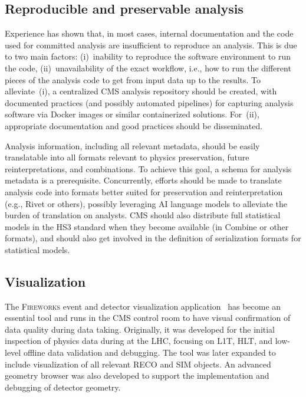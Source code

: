\subsection{Reproducible and preservable analysis}

Experience has shown that, in most cases, internal documentation and the code used for committed analysis are insufficient to reproduce an analysis. This is due to two main factors: (i)~inability to reproduce the software environment to run the code, (ii)~unavailability of the exact workflow, i.e., how to run the different pieces of the analysis code to get from input data up to the results. To alleviate~(i), a centralized CMS analysis repository should be created, with documented practices (and possibly automated pipelines) for capturing analysis software via Docker images or similar containerized solutions.
For~(ii), appropriate documentation and good practices should be disseminated.

Analysis information, including all relevant metadata, should be easily translatable into all formats relevant to physics preservation, future reinterpretations, and combinations. To achieve this goal, a schema for analysis metadata is a prerequisite. Concurrently, efforts should be made to translate analysis code into formats better suited for preservation and reinterpretation (e.g., Rivet
or others), possibly leveraging \gls{AI} language models to alleviate the burden of translation on analysts. CMS should also distribute full statistical models in the HS3 standard when they become available (in Combine or other formats), and should also get involved in the definition of serialization formats for statistical models. 

\subsection{Visualization}

The \textsc{Fireworks} event and detector visualization application~\cite{fireworksKovalskyi:2010zz} has become an essential tool and runs in the CMS control room to have visual confirmation of data quality during data taking. 
Originally, it was developed for the initial inspection of physics data during \RunOne at the LHC, focusing on \gls{L1T}, \gls{HLT}, and low-level offline data validation and debugging. The tool was later expanded to include visualization of all relevant \gls{RECO} and \gls{SIM} objects. An advanced geometry browser was also developed to support the implementation and debugging of detector geometry. 

